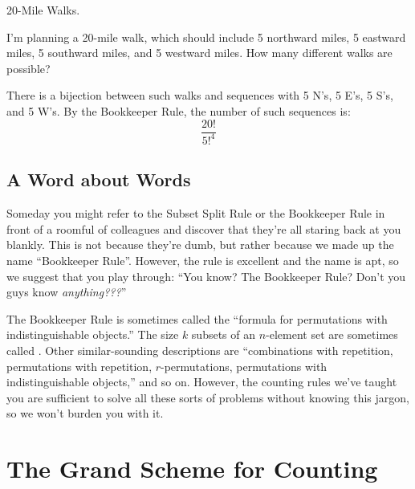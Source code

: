 \begin{example*} 20-Mile Walks.

I'm planning a 20-mile walk, which should include 5 northward miles, 5
eastward miles, 5 southward miles, and 5 westward miles.  How many
different walks are possible?

There is a bijection between such walks and sequences with 5 N's, 5
E's, 5 S's, and 5 W's.  By the Bookkeeper Rule, the number of such
sequences is:
\[
\frac{20!}{5!^4}
\]
\end{example*}

\subsection{A Word about Words}

Someday you might refer to the Subset Split Rule or the Bookkeeper Rule
in front of a roomful of colleagues and discover that they're all staring
back at you blankly.  This is not because they're dumb, but rather because
we made up the name ``Bookkeeper Rule''.  However, the rule is excellent
and the name is apt, so we suggest that you play through: ``You know?  The
Bookkeeper Rule?  Don't you guys know \emph{anything???}''

The Bookkeeper Rule is sometimes called the ``formula for permutations
with indistinguishable objects.''  The size $k$ subsets of an $n$-element
set are sometimes called .  Other similar-sounding
descriptions are ``combinations with repetition, permutations with
repetition, $r$-permutations, permutations with indistinguishable
objects,'' and so on.  However, the counting rules we've taught you are
sufficient to solve all these sorts of problems without knowing this
jargon, so we won't burden you with it.

\begin{problems}
\classproblems
{}

\homeworkproblems
{}

\end{problems}

\iffalse


\section{The Grand Scheme for Counting}

